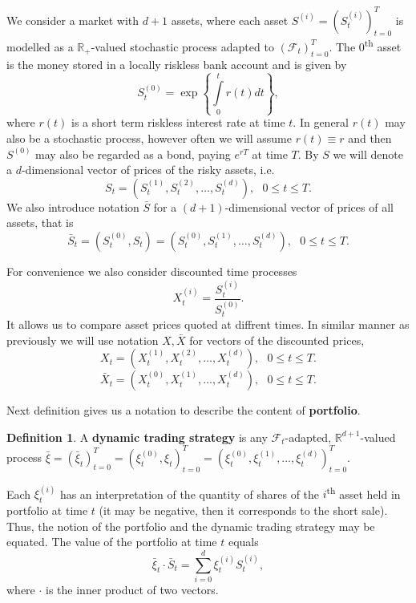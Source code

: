 \documentclass[a4paper,11pt, twoside]{book}
\theoremstyle{definition}
\newtheorem{mydef}{Definition}[chapter]
\theoremstyle{remark}
\def\R{{\mathbb{R}}}
\def\Sa{\bar{S}}
\def\Xa{\bar{X}}
\def\xia{\bar{\xi}}
\begin{document}
We consider a market with $d+1$ assets, where each asset $S^{(i)} = (S^{(i)}_t)_{t=0}^T$ is modelled as a $\R_+$-valued stochastic process adapted to $(\mathcal{F}_t)_{t=0}^T$. The $0$\textsuperscript{th} asset is the money stored in a locally riskless bank account and is given by 
\[S^{(0)}_t = \exp\left\{ \int\limits_0^t r(t)dt \right\},\]
where $r(t)$ is a short term riskless interest rate at time $t$. In general $r(t)$ may also be a stochastic process, however often we will assume $r(t) \equiv r$ and then $S^{(0)}$ may also be regarded as a bond, paying $e^{rT}$ at time $T$. By $S$ we will denote a $d$-dimensional vector of prices of the risky assets, i.e.
\begin{equation*}
 S_t = (S^{(1)}_t, S^{(2)}_t, \ldots, S^{(d)}_t), \ \ \ 0 \leq t \leq T.
\end{equation*}
We also introduce notation $\Sa$ for a $(d+1)$-dimensional vector of prices of all assets, that is
\begin{equation*}
 \Sa_t = (S^{(0)}_t, S_t) = (S^{(0)}_t, S^{(1)}_t, \ldots, S^{(d)}_t), \ \ \ 0 \leq t \leq T.
\end{equation*}

For convenience we also consider discounted time processes
\[ X^{(i)}_t = \frac{S^{(i)}_t}{S^{(0)}_t}. \]
It allows us to compare asset prices quoted at diffrent times. In similar manner as previously we will use notation $X, \Xa$ for vectors of the discounted prices,
\begin{equation*}
 X_t = (X^{(1)}_t, X^{(2)}_t, \ldots, X^{(d)}_t), \ \ \ 0 \leq t \leq T.
\end{equation*}
\begin{equation*}
 \Xa_t = (X^{(0)}_t, X^{(1)}_t, \ldots, X^{(d)}_t), \ \ \ 0 \leq t \leq T.
\end{equation*}

Next definition gives us a notation to describe the content of \textbf{portfolio}.
\begin{mydef}
A \textbf{dynamic trading strategy} is any $\mathcal{F}_t$-adapted,  $\R^{d+1}$-valued process $\xia = (\xia_t)_{t=0}^T = (\xi^{(0)}_t, \xi_t)_{t=0}^T = (\xi^{(0)}_t, \xi^{(1)}_t, \ldots, \xi^{(d)}_t)_{t=0}^T$.
\end{mydef}
Each $\xi^{(i)}_t$ has an interpretation of the quantity of shares of the $i$\textsuperscript{th} asset held in portfolio at time $t$ (it may be negative, then it corresponds to the short sale). Thus, the notion of the portfolio and the dynamic trading strategy may be equated. The value of the portfolio at time $t$ equals
\[\xia_t \cdot \Sa_t = \sum\limits_{i=0}^d \xi^{(i)}_t S^{(i)}_t,\]
where $\cdot$ is the inner product of two vectors.
\end{document}

